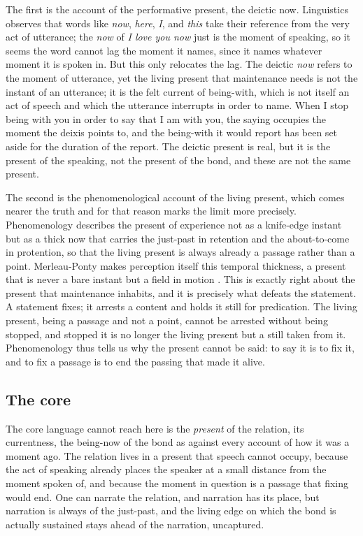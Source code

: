 The first is the account of the performative present, the deictic now. Linguistics observes that words like \emph{now}, \emph{here}, \emph{I}, and \emph{this} take their reference from the very act of utterance; the \emph{now} of \emph{I love you now} just is the moment of speaking, so it seems the word cannot lag the moment it names, since it names whatever moment it is spoken in. But this only relocates the lag. The deictic \emph{now} refers to the moment of utterance, yet the living present that maintenance needs is not the instant of an utterance; it is the felt current of being-with, which is not itself an act of speech and which the utterance interrupts in order to name. When I stop being with you in order to say that I am with you, the saying occupies the moment the deixis points to, and the being-with it would report has been set aside for the duration of the report. The deictic present is real, but it is the present of the speaking, not the present of the bond, and these are not the same present.

The second is the phenomenological account of the living present, which comes nearer the truth and for that reason marks the limit more precisely. Phenomenology describes the present of experience not as a knife-edge instant but as a thick now that carries the just-past in retention and the about-to-come in protention, so that the living present is always already a passage rather than a point. Merleau-Ponty makes perception itself this temporal thickness, a present that is never a bare instant but a field in motion \parencite{merleauponty1962phenomenology}. This is exactly right about the present that maintenance inhabits, and it is precisely what defeats the statement. A statement fixes; it arrests a content and holds it still for predication. The living present, being a passage and not a point, cannot be arrested without being stopped, and stopped it is no longer the living present but a still taken from it. Phenomenology thus tells us why the present cannot be said: to say it is to fix it, and to fix a passage is to end the passing that made it alive.

\subsection*{The core}

The core language cannot reach here is the \emph{present} of the relation, its currentness, the being-now of the bond as against every account of how it was a moment ago. The relation lives in a present that speech cannot occupy, because the act of speaking already places the speaker at a small distance from the moment spoken of, and because the moment in question is a passage that fixing would end. One can narrate the relation, and narration has its place, but narration is always of the just-past, and the living edge on which the bond is actually sustained stays ahead of the narration, uncaptured.


